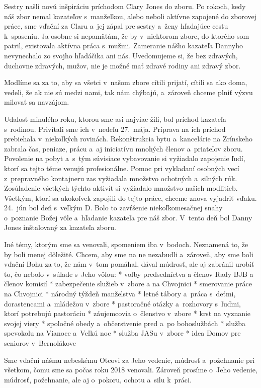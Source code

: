 Sestry našli novú inšpiráciu príchodom Clary Jones do zboru. Po rokoch, kedy náš zbor nemal kazateľov s~manželkou, alebo neboli aktívne zapojené do zborovej práce, sme vďační za Claru a~jej zápal pre sestry a~ženy hľadajúce cestu k~spaseniu.
Ja osobne si nepamätám, že by v~niektorom zbore, do ktorého som patril, existovala aktívna práca s~mužmi. Zameranie nášho kazateľa Dannyho nevynechalo zo svojho hľadáčika ani nás. Uvedomujeme si, že bez zdravých, duchovne zdravých, mužov, nie je možné mať zdravé rodiny ani zdravý zbor.

Modlíme sa za to, aby sa všetci v~našom zbore cítili prijatí, cítili sa ako doma, vedeli, že ak nie sú medzi nami, tak nám chýbajú, a~zároveň chceme plniť výzvu milovať sa navzájom.

Udalosť minulého roku, ktorou sme asi najviac žili, bol príchod kazateľa s~rodinou. Privítali sme ich v~nedeľu 27.~mája. Príprava na ich príchod prebiehala v~niekoľkých rovinách. Rekonštrukcia bytu a~kancelárie na Zrínskeho zabrala čas, peniaze, prácu a~aj iniciatívu mnohých členov a~priateľov zboru. Povolenie na pobyt a~s~tým súvisiace vybavovanie si vyžiadalo zapojenie ľudí, ktorí sa tejto téme venujú profesionálne. Pomoc pri vykladaní osobných vecí z~prepravného kontajneru zas vyžiadala množstvo ochotných a~silných rúk. Zosúladenie všetkých týchto aktivít si vyžiadalo množstvo našich modlitieb. Všetkým, ktorí sa akokoľvek zapojili do tejto práce, chceme znova vyjadriť vďaku.  24.~jún bol deň s~veľkým D. Bolo to zavŕšenie niekoľkomesačnej snahy o~poznanie Božej vôle a~hľadanie kazateľa pre náš zbor. V~tento deň bol Danny Jones inštalovaný za kazateľa zboru.

Iné témy, ktorým sme sa venovali, spomeniem iba v~bodoch. Neznamená to, že by boli menej dôležité. Chcem, aby sme na ne nezabudli a~zároveň, aby sme boli vďační Bohu za to, že nám v~tom pomáhal, dával múdrosť, ale aj zabránil urobiť to, čo nebolo v~súlade s~Jeho vôľou:
\begitems
* voľby predsedníctva a členov Rady BJB a členov komisií
* zabezpečenie služieb v~zbore a na Chvojnici
* smerovanie práce na Chvojnici
* národný týždeň manželstva
* letné tábory a~práca s~deťmi, dorastencami a~mládežou v~zbore
* pastoračné otázky a~rozhovory s~ľuďmi, ktorí potrebujú pastoráciu
* záujemcovia o~členstvo v~zbore
* krst na vyznanie svojej viery
* spoločné obedy a~občerstvenie pred a~po bohoslužbách
* služba spevokolu na Vianoce a~Veľkú noc
* služba JASu v~zbore
* idea Domov pre seniorov v~Bernolákove
\enditems

Sme vďační nášmu nebeskému Otcovi za Jeho vedenie, múdrosť a~požehnanie pri všetkom, čomu sme sa počas roku 2018 venovali. Zároveň prosíme o~Jeho vedenie, múdrosť, požehnanie, ale aj o~pokoru, ochotu a~silu k~práci.

